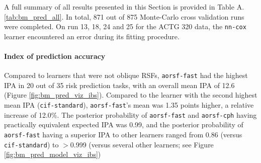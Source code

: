 \documentclass[twoside,11pt]{article}\usepackage[]{graphicx}\usepackage[]{xcolor}
\newcommand{\tabrefAppendix}[1]{Table A.\ref{#1}}
\begin{document}
A full summary of all results presented in this Section is provided in \tabrefAppendix{tab:bm_pred_all}. In total, 871 out of 875 Monte-Carlo cross validation runs were completed. On run 13, 18, 24 and 25 for the ACTG 320 data, the \texttt{nn-cox} learner encountered an error during its fitting procedure.

\paragraph{Index of prediction accuracy}

Compared to learners that were not oblique RSFs, \texttt{aorsf-fast} had the highest IPA in 20 out of 35 risk prediction tasks, with an overall mean IPA of 12.6 (Figure \ref{fig:bm_pred_viz_ibs}). Compared to the learner with the second highest mean IPA (\texttt{cif-standard}), \texttt{aorsf-fast}'s mean was 1.35 points higher, a relative increase of 12.0\%. The posterior probability of \texttt{aorsf-fast} and \texttt{aorsf-cph} having practically equivalent expected IPA was 0.99, and the posterior probability of \texttt{aorsf-fast} having a superior IPA to other learners ranged from 0.86 (versus \texttt{cif-standard}) to $>$0.999 (versus several other learners; see Figure \ref{fig:bm_pred_model_viz_ibs})
\end{document}
